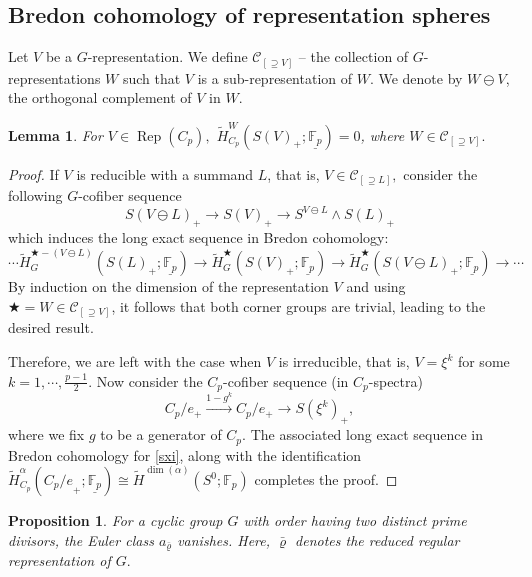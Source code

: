 \documentclass[a4paper,leqno,11pt]{amsart}
\renewcommand{\rho}{\varrho}
\newcommand{\CC}{\mathcal{C}}
\newcommand{\bF}{\mathbb{F}}
\newcommand{\bFp}{\bF_p}
\newcommand{\uFp}{\underline{\bFp}}
\newcommand{\Rep}{\operatorname{Rep}}
\newcommand{\bs}{\bigstar}
\newcommand{\tH}{\tilde{H}}
\newcommand{\tHbs}{\tilde{H}^\bigstar_G}
\newenvironment{myeq}[1][]
{\stepcounter{theorem}\begin{equation}\tag{\thetheorem}{#1}}
{\end{equation}}
\theoremstyle{plain}
\newtheorem{lemma}[theorem]{Lemma}
\newtheorem{prop}[theorem]{Proposition}
\theoremstyle{definition}
\theoremstyle{remark}
\begin{document}
\subsection{Bredon cohomology of representation spheres}
Let $V$ be a $G$-representation. We define  $\CC_{[\supseteq V]}$ -- the collection of $G$-representations $W$ such that $V$ is a sub-representation of $W$. We denote by $W \ominus V$, the orthogonal complement of $V$ in $W.$
\begin{lemma}\label{Cohsphere}
    For $V \in \Rep(C_{p}),$ $\tilde{H}^W_{C_p}(S(V)_+; \uFp)=0$, where $W \in \CC_{[\supseteq V]}.$
\end{lemma}

\begin{proof}
If $V$ is reducible with a summand $L$, that is,  $V \in \CC_{[\supseteq L]},$  consider the following $G$-cofiber sequence
\[
S(V\ominus L)_+ \to S(V)_+ \to S^{V\ominus L}\wedge S(L)_+
\]
which induces the long exact sequence in Bredon cohomology:
\[
\cdots \tH^{\bs -(V\ominus L)}_{G}(S(L)_+; \uFp) \to \tHbs(S(V)_+; \uFp) \to \tHbs(S(V\ominus L)_+; \uFp) \to \cdots
\]
By induction on the dimension of the representation $V$ and using $\bs=W \in \CC_{[\supseteq V]}$, it follows that both corner groups are trivial, leading to the desired result.

Therefore, we are left with the case when $V$ is irreducible, that is, $V= \xi^k$ for some $k =1, \cdots , \frac{p-1}{2}.$ Now consider the $C_p$-cofiber sequence (in $C_p$-spectra)
\begin{myeq}\label{sxi}
 C_{p}/e_{+} \stackrel{1-g^k}{\to} C_{p}/e_{+} \to S(\xi^k)_{+},
\end{myeq}
where we fix $g$ to be a generator of $C_p.$ The associated long exact sequence in Bredon cohomology for \eqref{sxi}, along with the identification $\tilde{H}^\alpha_{C_p}({C_p/e}_+; \uFp) \cong \tilde{H}^{\dim(\alpha)} (S^0; \bFp)$ completes the proof.
\end{proof}





\begin{prop}
    For a cyclic group $G$ with order having two distinct prime divisors, the Euler class $a_{\bar{\rho}}$ vanishes. Here, $\bar{\rho}$ denotes the reduced regular representation of $G.$
\end{prop}
\end{document}
